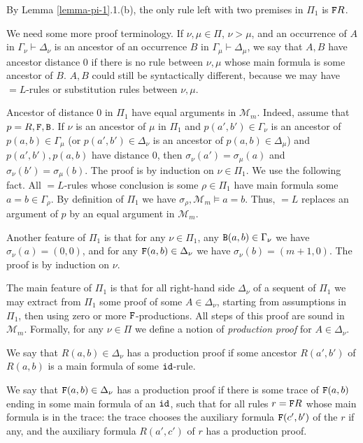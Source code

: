 \documentclass[a4paper,12pt]{article}
\newcommand{\setM}              { {\mathcal M} }
\newcommand{\Backward}         { {\tt B} }
\newcommand{\Forward}         { {\tt F} }
\newcommand{\id}              { {\tt id} }
\newcommand{\eqL}     {= \! \!  \!  L}
\begin{document}
By Lemma \ref{lemma-pi-1}.1.(b), the only rule left with two premises in $\Pi_1$ is $\Forward R$. 

We need some more proof terminology. If $\nu, \mu \in \Pi$, $\nu > \mu$, and an occurrence of $A$ in $\Gamma_\nu \vdash \Delta_\nu$ is an ancestor of an occurrence $B$ in $\Gamma_\mu \vdash \Delta_\mu$, we say that $A, B$ have ancestor distance $0$ if there is no rule between $\nu, \mu$ whose main formula is some ancestor of $B$. $A,B$ could still be syntactically different, because we may have $\eqL$-rules or substitution rules between $\nu, \mu$. 

Ancestor of distance $0$ in $\Pi_1$ have equal arguments in $\setM_m$. Indeed, assume that $p=R, \Forward, \Backward$. If $\nu$ is an ancestor of $\mu$ in $\Pi_1$ and $p(a',b') \in \Gamma_\nu$ is an ancestor of $p(a,b) \in \Gamma_\mu$ (or $p(a',b') \in \Delta_\nu$ is an ancestor of $p(a,b) \in \Delta_\mu$)  and $p(a',b'), p(a,b)$ have distance $0$, then $\sigma_\nu(a')=\sigma_\mu(a)$ and $\sigma_\nu(b')=\sigma_\mu(b)$. The proof is by induction on $\nu \in \Pi_1$. We use the following fact. All $\eqL$-rules whose conclusion is some $\rho \in \Pi_1$ have main formula some $a=b \in \Gamma_\rho$. By definition of $\Pi_1$ we have $\sigma_\rho, \setM_m \models a=b$. Thus, $\eqL$ replaces an argument of $p$ by an equal argument in $\setM_m$.

Another feature of $\Pi_1$ is that for any $\nu \in \Pi_1$, any $\Backward(a,b) \in \Gamma_\nu$ we have $\sigma_\nu(a) = (0,0)$, and for any $\Forward(a,b) \in \Delta_\nu$ we have $\sigma_\nu(b) = (m+1,0)$. The proof is by induction on $\nu$.

The main feature of $\Pi_1$ is that for all right-hand side $\Delta_\nu$ of a sequent of $\Pi_1$ we may extract from $\Pi_1$ some proof of some $A \in \Delta_\nu$, starting from assumptions in  $\Pi_1$, then using zero or more $\Forward$-productions. All steps of this proof are sound in $\setM_m$. Formally, for any $\nu \in \Pi$ we define a notion of \emph{production proof} for $A \in \Delta_\nu$. 

We say that $R(a,b) \in \Delta_\nu$ has  a production proof if some ancestor $R(a',b')$ of $R(a,b)$ is a main formula of some $\id$-rule. 

We say that $\Forward(a,b) \in \Delta_\nu$ has a production proof if there is some trace of $\Forward(a,b)$ ending in some main formula of an $\id$, such that for all rules $r=\Forward R$ whose main formula is in the trace: the trace chooses the auxiliary formula $\Forward(c',b')$ of the $r$ if any, and the auxiliary formula $R(a',c')$ of $r$ has a production proof. 
\end{document}
